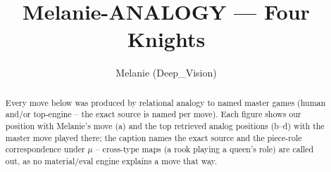 \documentclass[11pt]{article}
\title{Melanie-ANALOGY — Four Knights}
\author{Melanie (Deep\_Vision)}
\date{}
\begin{document}
\maketitle

\begin{abstract}Every move below was produced by relational analogy to named master games (human and/or top-engine -- the exact source is named per move). Each figure shows our position with Melanie's move (a) and the top retrieved analog positions (b--d) with the master move played there; the caption names the exact source and the piece-role correspondence under $\mu$ -- cross-type maps (a rook playing a queen's role) are called out, as no material/eval engine explains a move that way.\end{abstract}

\begin{figure}[p]\centering
\begin{subfigure}{0.46\textwidth}\centering
\resizebox{\linewidth}{!}{%
\newchessgame
\chessboard[
  setfen={r1bq1rk1/ppp2ppp/2Bp1n2/4p3/1b2P3/2NP1N2/PPP2PPP/R1BQ1RK1 b - - 0 7},
  showmover=false,
  pgfstyle=straightmove, color=movearrow, markmove={b7-c6}
]}
\caption{}
\end{subfigure}\hfill
\begin{subfigure}{0.46\textwidth}\centering
\resizebox{\linewidth}{!}{%
\newchessgame
\chessboard[
  setfen={r1bq1rk1/pp2ppbp/2Bp1np1/2p3B1/4P3/2NP1N2/PPP2PPP/R2Q1RK1 b - - 0 8},
  showmover=false,
  pgfstyle=straightmove, color=movearrow, markmove={b7-c6}
]}
\caption{}
\end{subfigure}
\\[4pt]
\begin{subfigure}{0.46\textwidth}\centering
\resizebox{\linewidth}{!}{%
\newchessgame
\chessboard[
  setfen={r1bq1rk1/pp2ppbp/2Bp1np1/2p3B1/4P3/2NP1N2/PPP2PPP/R2Q1RK1 b - - 0 8},
  showmover=false,
  pgfstyle=straightmove, color=movearrow, markmove={b7-c6}
]}
\caption{}
\end{subfigure}\hfill
\begin{subfigure}{0.46\textwidth}\centering
\resizebox{\linewidth}{!}{%
\newchessgame
\chessboard[
  setfen={r1bq1rk1/pp2ppbp/2Bp1np1/2p3B1/4P3/2NP1N2/PPP2PPP/R2Q1RK1 b - - 0 8},
  showmover=false,
  pgfstyle=straightmove, color=movearrow, markmove={b7-c6}
]}
\caption{}
\end{subfigure}

\end{figure}
\end{document}
